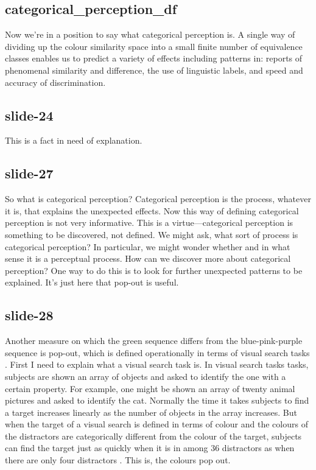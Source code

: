 \documentclass[12pt,\papersize]{extarticle}
\begin{document}
\subsection{categorical\_perception\_df}
Now we're in a position to say what categorical perception is.
A single way of dividing up the colour similarity space into a small finite number of
equivalence classes enables us to predict a variety of effects including patterns in:
reports of phenomenal similarity and difference, the use of linguistic labels, and
speed and accuracy of discrimination.

\subsection{slide-24}
This is a fact in need of explanation.

\subsection{slide-27}
So what is categorical perception?
Categorical perception is the process, whatever it is, that explains the unexpected effects.
Now this way of defining categorical perception is not very informative.
This is a virtue---categorical perception is something to be discovered, not defined.
We might ask, what sort of process is categorical perception?
In particular, we might wonder whether and in what sense it is a perceptual process.
How can we discover more about categorical perception?
One way to do this is to look for further unexpected patterns to be explained.
It's just here that pop-out is useful.

\subsection{slide-28}
Another measure on which the green sequence differs from the blue-pink-purple sequence is pop-out, which is defined operationally in terms of visual search tasks \citep[p.\ 117]{Treisman:1986pm}.
First I need to explain what a visual search task is.
In visual search tasks tasks, subjects are shown an array of objects and asked to identify the one with a certain property.
For example, one might be shown an array of twenty animal pictures and asked to identify the cat.
Normally the time it takes subjects to find a target increases linearly as the number of objects in the array increases.
But when the target of a visual search is defined in terms of colour and the colours of the distractors are categorically different from the colour of the target, subjects can find the target just as quickly when it is in among 36 distractors as when there are only four distractors \citep[Experiment 1]{Daoutis:2006qk}.
This is, the colours pop out.
\end{document}
